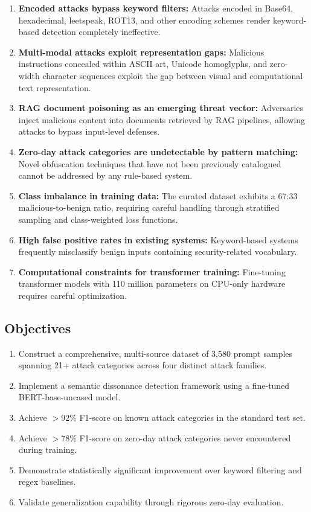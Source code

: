 \documentclass[11pt]{article}
\begin{document}
\begin{enumerate}[leftmargin=*]
  \item \textbf{Encoded attacks bypass keyword filters:} Attacks encoded in Base64, hexadecimal, leetspeak, ROT13, and other encoding schemes render keyword-based detection completely ineffective.
  \item \textbf{Multi-modal attacks exploit representation gaps:} Malicious instructions concealed within ASCII art, Unicode homoglyphs, and zero-width character sequences exploit the gap between visual and computational text representation.
  \item \textbf{RAG document poisoning as an emerging threat vector:} Adversaries inject malicious content into documents retrieved by RAG pipelines, allowing attacks to bypass input-level defenses.
  \item \textbf{Zero-day attack categories are undetectable by pattern matching:} Novel obfuscation techniques that have not been previously catalogued cannot be addressed by any rule-based system.
  \item \textbf{Class imbalance in training data:} The curated dataset exhibits a 67:33 malicious-to-benign ratio, requiring careful handling through stratified sampling and class-weighted loss functions.
  \item \textbf{High false positive rates in existing systems:} Keyword-based systems frequently misclassify benign inputs containing security-related vocabulary.
  \item \textbf{Computational constraints for transformer training:} Fine-tuning transformer models with 110 million parameters on CPU-only hardware requires careful optimization.
\end{enumerate}

\subsection*{Objectives}

\begin{enumerate}[leftmargin=*]
  \item Construct a comprehensive, multi-source dataset of 3,580 prompt samples spanning 21+ attack categories across four distinct attack families.
  \item Implement a semantic dissonance detection framework using a fine-tuned BERT-base-uncased model.
  \item Achieve $>$92\% F1-score on known attack categories in the standard test set.
  \item Achieve $>$78\% F1-score on zero-day attack categories never encountered during training.
  \item Demonstrate statistically significant improvement over keyword filtering and regex baselines.
  \item Validate generalization capability through rigorous zero-day evaluation.
\end{enumerate}
\end{document}
